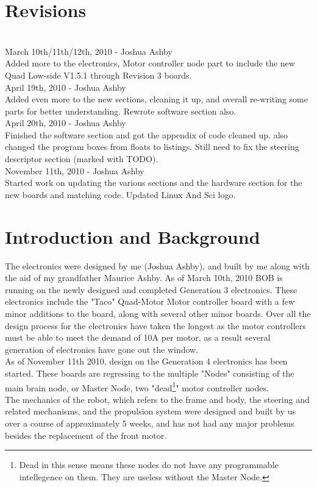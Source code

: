 \documentclass{article}
\begin{document}
\newpage
\tableofcontents
\listoffigures
\renewcommand{\lstlistlistingname}{List of Files \& Examples}
\lstlistoflistings

\newpage

\section{Revisions}\\
March 10th/11th/12th, 2010 - Joshua Ashby\\
Added more to the electronics, Motor controller node part to include the new Quad Low-side V1.5.1 through Revision 3 boards.\\
April 19th, 2010 - Joshua Ashby\\
Added even more to the new sections, cleaning it up, and overall re-writing some parts for better understanding. Rewrote software section also.\\
April 20th, 2010 - Joshua Ashby\\
Finished the software section and got the appendix of code cleaned up. also changed the program boxes from floats to listings. Still need to fix the steering descriptor section (marked with TODO).\\
November 11th, 2010 - Joshua Ashby\\
Started work on updating the various sections and the hardware section for the new boards and matching code. Updated Linux And Sci logo.\\

\newpage

\section{Introduction and Background}
The electronics were designed by me (Joshua Ashby), and built by me along with the aid of my grandfather Maurice Ashby. As of March 10th, 2010 BOB is running on the newly designed and completed Generation 3 electronics. These electronics include the "Taco" Quad-Motor Motor controller board with a few minor additions to the board, along with several other minor boards. Over all the design process for the electronics have taken the longest as the motor controllers must be able to meet the demand of 10A per motor, as a result several generation of electronics have gone out the window.\\
As of November 11th 2010, design on the Generation 4 electronics has been started. These boards are regressing to the multiple "Nodes" consisting of the main brain node, or Master Node, two "dead\footnote{Dead in this sense means these nodes do not have any programmable intellegence on them. They are useless without the Master Node.}" motor controller nodes.\\
The mechanics of the robot, which refers to the frame and body, the steering and related mechanisms, and the propulsion system were designed and built by us over a course of approximately 5 weeks, and has not had any major problems besides the replacement of the front motor.\\
\end{document}
